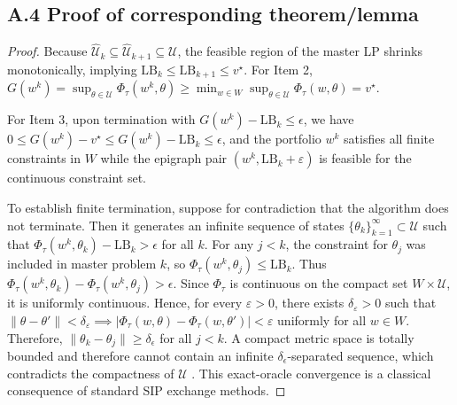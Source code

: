 \documentclass[smallextended]{svjour3}
\begin{document}
\subsection*{A.4 Proof of corresponding theorem/lemma}
\begin{proof}
Because $\widehat{\mathcal{U}}_k \subseteq \widehat{\mathcal{U}}_{k+1} \subseteq \mathcal{U}$, the feasible region of the master LP shrinks monotonically, implying $\mathrm{LB}_k \le \mathrm{LB}_{k+1} \le v^\star$. For Item 2, $G(w^k) = \sup_{\theta \in \mathcal{U}} \Phi_\tau(w^k, \theta) \ge \min_{w \in W} \sup_{\theta \in \mathcal{U}} \Phi_\tau(w, \theta) = v^\star$.

For Item 3, upon termination with $G(w^k) - \mathrm{LB}_k \le \epsilon$, we have $0 \le G(w^k) - v^\star \le G(w^k) - \mathrm{LB}_k \le \epsilon$, and the portfolio $w^k$ satisfies all finite constraints in $W$ while the epigraph pair $(w^k, \mathrm{LB}_k+\varepsilon)$ is feasible for the continuous constraint set.

To establish finite termination, suppose for contradiction that the algorithm does not terminate. Then it generates an infinite sequence of states $\{\theta_k\}_{k=1}^\infty \subset \mathcal{U}$ such that $\Phi_\tau(w^k, \theta_k) - \mathrm{LB}_k > \epsilon$ for all $k$. For any $j < k$, the constraint for $\theta_j$ was included in master problem $k$, so $\Phi_\tau(w^k, \theta_j) \le \mathrm{LB}_k$. Thus $\Phi_\tau(w^k, \theta_k) - \Phi_\tau(w^k, \theta_j) > \epsilon$. Since $\Phi_\tau$ is continuous on the compact set $W\times \mathcal{U}$, it is uniformly continuous. Hence, for every $\varepsilon>0$, there exists $\delta_\varepsilon>0$ such that $\|\theta-\theta'\|<\delta_\varepsilon \implies |\Phi_\tau(w,\theta)-\Phi_\tau(w,\theta')|<\varepsilon$ uniformly for all $w\in W$. Therefore, $\|\theta_k - \theta_j\| \ge \delta_\epsilon$ for all $j < k$. A compact metric space is totally bounded and therefore cannot contain an infinite $\delta_\epsilon$-separated sequence, which contradicts the compactness of $\mathcal{U}$ \citep{hettich1993semi, lopez2007semi}. This exact-oracle convergence is a classical consequence of standard SIP exchange methods.
\end{proof}
\end{document}
